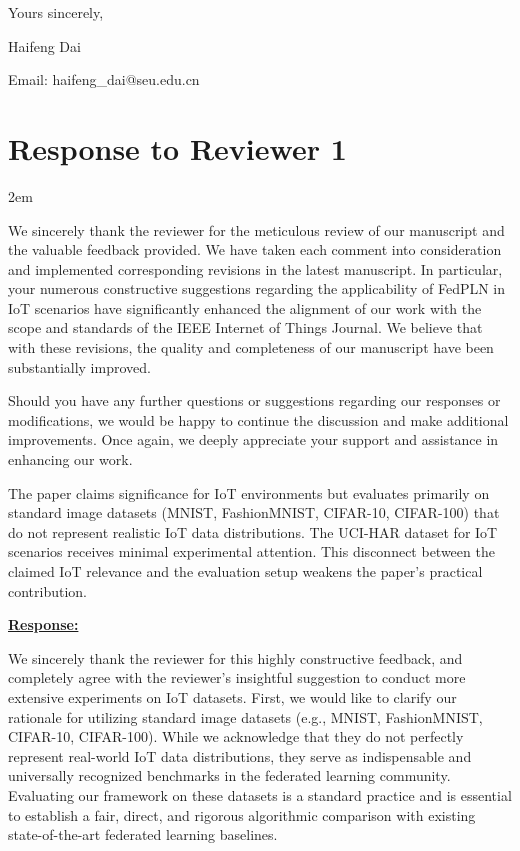 \documentclass[a4paper,12pt]{article}
\begin{document}
\bigskip

\bigskip

\noindent
Yours sincerely,

\smallskip

\noindent
Haifeng Dai
\smallskip

\noindent
Email: haifeng\_dai@seu.edu.cn

\newpage
\section*{Response to Reviewer 1}
\parindent 2em

We sincerely thank the reviewer for the meticulous review of our manuscript and the valuable feedback provided.
We have taken each comment into consideration and implemented corresponding revisions in the latest manuscript.
In particular, your numerous constructive suggestions regarding the applicability of FedPLN in IoT scenarios have significantly enhanced the alignment of our work with the scope and standards of the IEEE Internet of Things Journal.
We believe that with these revisions, the quality and completeness of our manuscript have been substantially improved.

Should you have any further questions or suggestions regarding our responses or modifications, we would be happy to continue the discussion and make additional improvements.
Once again, we deeply appreciate your support and assistance in enhancing our work.

\begin{tcolorbox}[title = {Comment 1},fonttitle = \bfseries]
    The paper claims significance for IoT environments but evaluates primarily on standard image datasets (MNIST, FashionMNIST, CIFAR-10, CIFAR-100) that do not represent realistic IoT data distributions. The UCI-HAR dataset for IoT scenarios receives minimal experimental attention. This disconnect between the claimed IoT relevance and the evaluation setup weakens the paper's practical contribution.
\end{tcolorbox}

\noindent \underline {\textbf{Response:}}
\bigskip

We sincerely thank the reviewer for this highly constructive feedback, and completely agree with the reviewer's insightful suggestion to conduct more extensive experiments on IoT datasets.
First, we would like to clarify our rationale for utilizing standard image datasets (e.g., MNIST, FashionMNIST, CIFAR-10, CIFAR-100).
While we acknowledge that they do not perfectly represent real-world IoT data distributions, they serve as indispensable and universally recognized benchmarks in the federated learning community.
Evaluating our framework on these datasets is a standard practice and is essential to establish a fair, direct, and rigorous algorithmic comparison with existing state-of-the-art federated learning baselines.
\end{document}
